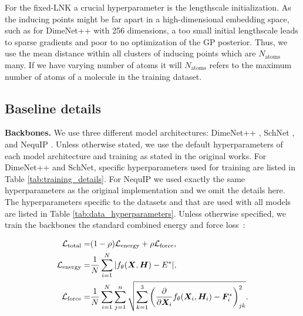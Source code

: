 For the fixed-LNK a crucial hyperparameter is the lengthscale initialization. As the inducing points might be far apart in a high-dimensional embedding space, such as for DimeNet++ with 256 dimensions, a too small initial lengthscale leads to sparse gradients and poor to no optimization of the GP posterior. Thus, we use the mean distance within all clusters of inducing points which are $N_{\text{atoms}}$ many. If we have varying number of atoms it will $N_{\text{atoms}}$ refers to the maximum number of atoms of a molecule in the training dataset. 

\begin{table}[!h]
    \centering
    
    \caption{Caption}
    \label{tab:lnk_hyperparameters}
\end{table}

\subsection{Baseline details}\label{app:baselinedetails}
\textbf{Backbones.} We use three different model architectures: DimeNet++ \citep{klicpera2020Fast}, SchNet \citep{schuttSchNetDeepLearning2018}, and NequIP \cite{batznerEquivariantGraphNeural2022}. Unless otherwise stated, we use the default hyperparameters of each model architecture and training as stated in the original works. For DimeNet++ and SchNet, specific hyperparameters used for training are listed in Table \ref{tab:training_details}. For NequIP we used exactly the same hyperparameters as the original implementation and we omit the details here. The hyperparameters specific to the datasets and that are used with all models are listed in Table \ref{tab:data_hyperparameters}. Unless otherwise specified, we train the backbones the standard combined energy and force loss~\citep{gasteigerDirectionalMessagePassing2019}:

\begin{align}
    \mathcal{L}_\text{total} =& (1-\rho)\mathcal{L}_\text{energy} + \rho\mathcal{L}_\text{force},\\
    \mathcal{L}_\text{energy} =& \frac{1}{N}\sum_{i=1}^N \vert f_\theta(\bm{X}, \bm{H}) - E^*\vert, \\
    \mathcal{L}_\text{force} =& \frac{1}{N}\sum_{i=1}^N \sum_{j=1}^{n} \sqrt{\sum_{k=1}^3 \left( \frac{\partial}{\partial \bm{X}_i}f_\theta(\bm{X}_i, \bm{H}_i) - \bm{F}_i^*\right)_{jk}^2}.
\end{align}


